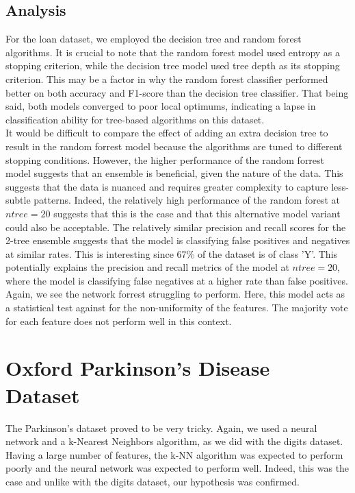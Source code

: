 \documentclass{article}
\begin{document}
\subsection*{Analysis}
For the loan dataset, we employed the decision tree and random forest algorithms.
It is crucial to note that the random forest model used entropy as a stopping criterion,
while the decision tree model used tree depth as its stopping criterion.
This may be a factor in why the random forest classifier performed better on both accuracy and F1-score
than the decision tree classifier.
That being said, both models converged to poor local optimums, 
indicating a lapse in classification ability for tree-based algorithms on this dataset.
\\

It would be difficult to compare the effect of adding an extra decision tree to result in the random forrest model because the algorithms are tuned to different stopping conditions.
However, the higher performance of the random forrest model suggests that an ensemble is beneficial, given the nature of the data. This suggests that the data is nuanced and requires greater complexity to capture 
less-subtle patterns. Indeed, the relatively high performance of the random forest at $ntree=20$ suggests that this is the case and that this alternative model variant could also be acceptable.
The relatively similar precision and recall scores for the 2-tree ensemble suggests that the model is classifying false positives and negatives at similar rates. This is interesting since 67\% of the dataset is of class 'Y'.
This potentially explains the precision and recall metrics of the model at $ntree=20$, where the model is classifying false negatives at a higher rate than false positives.
\\

Again, we see the network forrest struggling to perform. Here, this model acts as a statistical test against for the non-uniformity of the features. 
The majority vote for each feature does not perform well in this context.

\newpage
\section*{Oxford Parkinson's Disease Dataset}
The Parkinson's dataset proved to be very tricky. Again, we used a neural network and a k-Nearest Neighbors algorithm, as we did with the digits dataset.
Having a large number of features, the k-NN algorithm was expected to perform poorly and the neural network was expected to perform well.
Indeed, this was the case and unlike with the digits dataset, our hypothesis was confirmed.
\\
\end{document}
